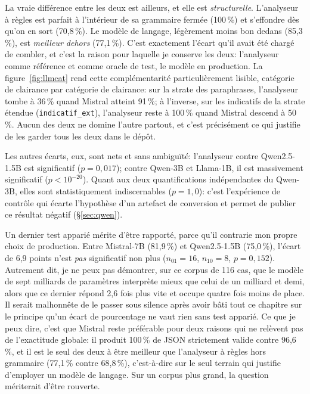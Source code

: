 \documentclass[11pt,a4paper]{article}
\begin{document}
La vraie différence entre les deux est ailleurs, et elle est \emph{structurelle}. L'analyseur à règles est parfait à l'intérieur de sa grammaire fermée (100\,\%) et s'effondre dès qu'on en sort (70,8\,\%). Le modèle de langage, légèrement moins bon dedans (85,3\,\%), est \emph{meilleur dehors} (77,1\,\%). C'est exactement l'écart qu'il avait été chargé de combler, et c'est la raison pour laquelle je conserve les deux: l'analyseur comme référence et comme oracle de test, le modèle en production. La figure~\ref{fig:llmcat} rend cette complémentarité particulièrement lisible, catégorie de clairance par catégorie de clairance: sur la strate des paraphrases, l'analyseur tombe à 36\,\% quand Mistral atteint 91\,\%; à l'inverse, sur les indicatifs de la strate étendue (\texttt{indicatif\_ext}), l'analyseur reste à 100\,\% quand Mistral descend à 50\,\%. Aucun des deux ne domine l'autre partout, et c'est précisément ce qui justifie de les garder tous les deux dans le dépôt.

Les autres écarts, eux, sont nets et sans ambiguïté: l'analyseur contre Qwen2.5-1.5B est significatif ($p = 0{,}017$); contre Qwen-3B et Llama-1B, il est massivement significatif ($p < 10^{-20}$). Quant aux deux quantifications indépendantes du Qwen-3B, elles sont statistiquement indiscernables ($p = 1{,}0$): c'est l'expérience de contrôle qui écarte l'hypothèse d'un artefact de conversion et permet de publier ce résultat négatif (\S\ref{sec:qwen}).

Un dernier test apparié mérite d'être rapporté, parce qu'il contrarie mon propre choix de production. Entre Mistral-7B (81,9\,\%) et Qwen2.5-1.5B (75,0\,\%), l'écart de 6,9 points n'est \emph{pas} significatif non plus ($n_{01} = 16$, $n_{10} = 8$, $p = 0{,}152$). Autrement dit, je ne peux pas démontrer, sur ce corpus de 116 cas, que le modèle de sept milliards de paramètres interprète mieux que celui de un milliard et demi, alors que ce dernier répond 2,6 fois plus vite et occupe quatre fois moins de place. Il serait malhonnête de le passer sous silence après avoir bâti tout ce chapitre sur le principe qu'un écart de pourcentage ne vaut rien sans test apparié. Ce que je peux dire, c'est que Mistral reste préférable pour deux raisons qui ne relèvent pas de l'exactitude globale: il produit 100\,\% de JSON strictement valide contre 96,6\,\%, et il est le seul des deux à être meilleur que l'analyseur à règles hors grammaire (77,1\,\% contre 68,8\,\%), c'est-à-dire sur le seul terrain qui justifie d'employer un modèle de langage. Sur un corpus plus grand, la question mériterait d'être rouverte.
\end{document}

